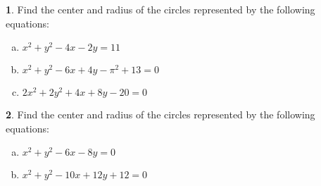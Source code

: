 \documentclass[12pt]{book}
\theoremstyle{definition}
\newtheorem{thm}{}
\begin{document}
\setcounter{thm}{6}
\begin{thm}
  Find the center and radius of the circles represented by the following equations:
  \begin{enumerate}[(a)]
    \item
      $\displaystyle{x^2 + y^2 - 4x - 2y = 11}$
    \item
      $\displaystyle{x^2 + y^2 - 6x + 4y - \pi^2 + 13 = 0}$
    \item
      $\displaystyle{2x^2 + 2y^2 + 4x + 8y - 20 = 0}$
  \end{enumerate}
\end{thm}

\setcounter{thm}{7}
\begin{thm}
  Find the center and radius of the circles represented by the following equations:
  \begin{enumerate}[(a)]
  \item
    $\displaystyle{x^2 + y^2 - 6x - 8y = 0}$
  \item
    $\displaystyle{x^2 + y^2 - 10x + 12y + 12 = 0}$
  \end{enumerate}
\end{thm}
\end{document}
